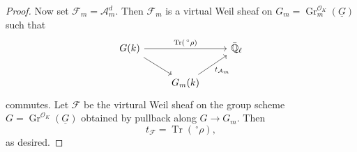 \documentclass[10pt]{amsart}
\theoremstyle{plain}
\theoremstyle{definition}
\newcommand{\EE}{\mathbb{\bar Q}_\ell}
\newcommand{\OK}{\mathcal{O}_K}
\newcommand{\Fq}{k}
\DeclareMathOperator{\Gr}{Gr}
\DeclareMathOperator{\trace}{Tr}
\newcommand{\trFrob}[1]{t_{#1}}
\newcommand{\cs}[1]{{\mathcal{#1}}}
\begin{document}
\begin{proof}
Now set $\cs{F}_m = \cs{A}_m^{d}$.
Then $\cs{F}_m$ is a virtual Weil sheaf on $G_m = \Gr^{\OK}_m(\underline{G})$ such that
\[
\begin{tikzcd}
G(\Fq) \arrow{rr}{\trace(\,^\circ \rho)} \arrow{rd} && \EE\\
& G_m(\Fq) \arrow{ru}[swap]{\trFrob{\cs{A}_m}} & 
\end{tikzcd}
\]
commutes.
Let $\cs{F}$ be the virtural Weil sheaf on the group scheme $G= \Gr^{\OK}(\underline{G})$ obtained by pullback along $G \to G_m$.
Then 
\[
\trFrob{\cs{F}} = \trace(\,^\circ \rho),
\] 
as desired.
\end{proof}


\end{document}
